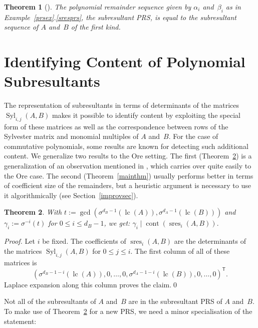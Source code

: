 \documentclass[3p,11pt,preprint]{elsarticle}
\newtheorem{theorem}{Theorem}
\newcommand{\lc}{\operatorname{lc}}
\newcommand{\syl}{\operatorname{Syl}}
\newcommand{\cont}{\operatorname{cont}}
\newcommand{\pres}{\operatorname{sres}}
\begin{document}
\begin{theorem}[\cite{zli}]
\label{zlithm}
 The polynomial remainder sequence given by $\alpha_i$ and~$\beta_i$ as in Example~\ref{prsex}.\ref{sresprs}, the subresultant PRS, is equal to the subresultant sequence of $A$ and~$B$ of the first kind.
\end{theorem}

\section{Identifying Content of Polynomial Subresultants}
\label{contentsec}

The representation of subresultants in terms of determinants of the matrices $\syl_{i,j}(A,B)$ makes it possible to identify content by exploiting the special form of these matrices as well as the correspondence between rows of the Sylvester matrix and monomial multiples of $A$ and~$B$. For the case of commutative polynomials, some results are known for detecting such additional content. We generalize two results to the Ore setting. The first (Theorem~\ref{simpleimprov}) is a generalization of an observation mentioned in \cite{brown}, which carries over quite easily to the Ore case. The second (Theorem~\ref{mainthm}) usually performs better in terms of coefficient size of the remainders, but a heuristic argument is necessary to use it algorithmically (see Section~\ref{improvsec}). 

\begin{theorem}
\label{simpleimprov}
 With $t:= \gcd(\sigma^{d_B-1}(\lc(A)),\sigma^{d_A-1}(\lc(B)))$ and~$\gamma_{i} := \sigma^{-i}(t)$ for $0\leq i\leq d_B-1$, we get: $\gamma_i\mid\cont(\pres_i(A,B)).$
\end{theorem}
\begin{proof}
 Let $i$ be fixed. The coefficients of $\pres_i(A,B)$ are the determinants of the matrices $\syl_{i,j}(A,B)$ for $0\leq j\leq i$. The first column of all of these matrices is
\[(\sigma^{d_B-1-i}(\lc(A)),0,\dots,0,\sigma^{d_A-1-i}(\lc(B)),0,\dots,0)^\mathsf{T}.\]
Laplace expansion along this column proves the claim.\qed
\end{proof}

Not all of the subresultants of $A$ and~$B$ are in the subresultant PRS of $A$ and~$B$. To make use of Theorem~\ref{simpleimprov} for a new PRS, we need a minor specialisation of the statement:
\end{document}
